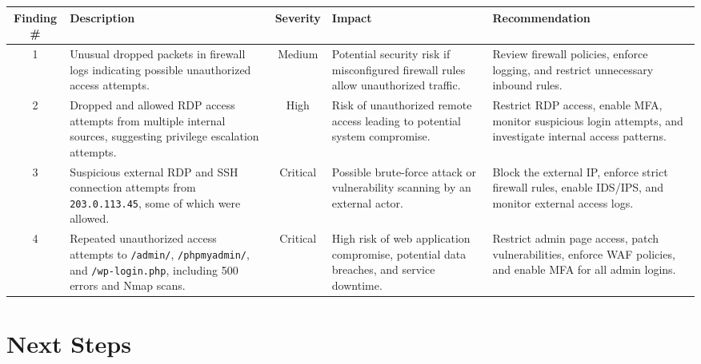 \documentclass[11pt]{article}
\begin{document}
\begin{longtable}{|c|p{4cm}|c|p{4cm}|p{4cm}|}
    \hline
    \textbf{Finding \#} & \textbf{Description} & \textbf{Severity} & \textbf{Impact} & \textbf{Recommendation} \\
    \hline
    1 & Unusual dropped packets in firewall logs indicating possible unauthorized access attempts. & Medium & Potential security risk if misconfigured firewall rules allow unauthorized traffic. & Review firewall policies, enforce logging, and restrict unnecessary inbound rules. \\
    \hline
    2 & Dropped and allowed RDP access attempts from multiple internal sources, suggesting privilege escalation attempts. & High & Risk of unauthorized remote access leading to potential system compromise. & Restrict RDP access, enable MFA, monitor suspicious login attempts, and investigate internal access patterns. \\
    \hline
    3 & Suspicious external RDP and SSH connection attempts from \texttt{203.0.113.45}, some of which were allowed. & Critical & Possible brute-force attack or vulnerability scanning by an external actor. & Block the external IP, enforce strict firewall rules, enable IDS/IPS, and monitor external access logs. \\
    \hline
    4 & Repeated unauthorized access attempts to \texttt{/admin/}, \texttt{/phpmyadmin/}, and \texttt{/wp-login.php}, including 500 errors and Nmap scans. & Critical & High risk of web application compromise, potential data breaches, and service downtime. & Restrict admin page access, patch vulnerabilities, enforce WAF policies, and enable MFA for all admin logins. \\
    \hline
\end{longtable}

\section{Next Steps}
\end{document}
